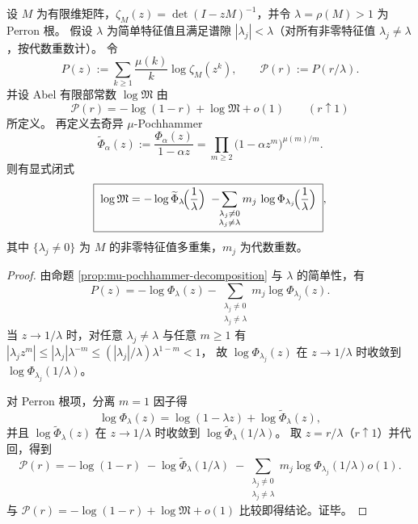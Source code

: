 \begin{theorem}\label{thm:finite-part-mu-pochhammer-spectral-closed-form}
设 \(M\) 为有限维矩阵，\(\zeta_M(z)=\det(I-zM)^{-1}\)，并令 \(\lambda=\rho(M)>1\) 为 Perron 根。
假设 \(\lambda\) 为简单特征值且满足谱隙 \(|\lambda_j|<\lambda\)（对所有非零特征值 \(\lambda_j\neq\lambda\)，按代数重数计）。
令
\[
P(z):=\sum_{k\ge 1}\frac{\mu(k)}{k}\log\zeta_M(z^k),
\qquad
\mathcal{P}(r):=P(r/\lambda).
\]
并设 Abel 有限部常数 \(\log\mathfrak{M}\) 由
\[
\mathcal{P}(r)=-\log(1-r)+\log\mathfrak{M}+o(1)\qquad(r\uparrow 1)
\]
所定义。
再定义去奇异 \texorpdfstring{$\mu$}{mu}-Pochhammer
\[
\widetilde{\Phi}_\alpha(z):=\frac{\Phi_\alpha(z)}{1-\alpha z}
=\prod_{m\ge 2}\bigl(1-\alpha z^m\bigr)^{\mu(m)/m}.
\]
则有显式闭式
\[
\boxed{\;
\log\mathfrak{M}
=-\log\widetilde{\Phi}_{\lambda}\!\Bigl(\frac{1}{\lambda}\Bigr)
\;-\!\!\sum_{\substack{\lambda_j\neq 0\\ \lambda_j\neq\lambda}}
m_j\,\log\Phi_{\lambda_j}\!\Bigl(\frac{1}{\lambda}\Bigr)\; } ,
\]
其中 \(\{\lambda_j\neq 0\}\) 为 \(M\) 的非零特征值多重集，\(m_j\) 为代数重数。
\end{theorem}

\begin{proof}
由命题 \ref{prop:mu-pochhammer-decomposition} 与 \(\lambda\) 的简单性，有
\[
P(z)=-\log\Phi_{\lambda}(z)-\!\!\sum_{\substack{\lambda_j\neq 0\\ \lambda_j\neq\lambda}}m_j\log\Phi_{\lambda_j}(z).
\]
当 \(z\to 1/\lambda\) 时，对任意 \(\lambda_j\neq\lambda\) 与任意 \(m\ge 1\) 有
\(
|\lambda_j z^m|
\le |\lambda_j|\lambda^{-m}
\le (|\lambda_j|/\lambda)\lambda^{1-m}<1
\)，
故 \(\log\Phi_{\lambda_j}(z)\) 在 \(z\to 1/\lambda\) 时收敛到 \(\log\Phi_{\lambda_j}(1/\lambda)\)。
\par
对 Perron 根项，分离 \(m=1\) 因子得
\[
\log\Phi_{\lambda}(z)=\log(1-\lambda z)+\log\widetilde{\Phi}_{\lambda}(z),
\]
并且 \(\log\widetilde{\Phi}_{\lambda}(z)\) 在 \(z\to 1/\lambda\) 时收敛到 \(\log\widetilde{\Phi}_{\lambda}(1/\lambda)\)。
取 \(z=r/\lambda\)（\(r\uparrow 1\)）并代回，得到
\[
\mathcal{P}(r)
=-\log(1-r)
\;-\log\widetilde{\Phi}_{\lambda}(1/\lambda)
\;-\!\!\sum_{\substack{\lambda_j\neq 0\\ \lambda_j\neq\lambda}}m_j\log\Phi_{\lambda_j}(1/\lambda)
o(1).
\]
与 \(\mathcal{P}(r)=-\log(1-r)+\log\mathfrak{M}+o(1)\) 比较即得结论。证毕。
\end{proof}
